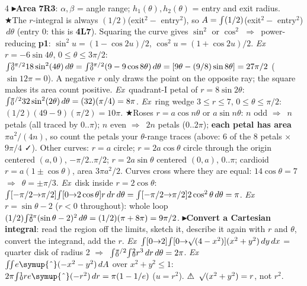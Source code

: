 \documentclass{article}
\newcommand\subx[1]{\sb{\smash{\raise0.20em\hbox{$\scriptstyle#1$}}}}    %
\newcommand\supy[1]{\sp{\smash{\lower0.02em\hbox{$\scriptstyle#1$}}}}    %
\newcommand\suby[1]{\sb{\smash{\raise0.10em\hbox{$\scriptstyle#1$}}}}    %
\newcommand\cx{\mathord{\symup{\char"5E}}}                               %
\newcommand\I[2]{{\smash{\int}}\suby{#1}\supy{#2}}                        %
\newcommand\Ia[2]{{\smash{\int}}[#1{\to}#2]}                              %
\newcommand\J{{\smash{\int}}}                                             %
\newcommand\II[1]{{\smash{\iint}}\subx{#1}}                               %
\newcommand\sh[1]{{\setlength\fboxsep{0.18pt}\colorbox{black!22}{\textbf{#1}}}}  %
\newcommand\pt[1]{\textbf{{\symf ▸}#1}}       %
\newcommand\ex{\textit{Ex}\ }                  %
\newcommand\warn{{\symf ⚠}}                    %
\newcommand\shc{{\symf ★}}                      %
\newcommand\ok{{\symf ✓}}                       %
\newcommand\rt{\smash{\surd}}                  %
\newcommand\then{\ensuremath{\Rightarrow}}
\begin{document}
\begin{multicols*}{4}
\pt{Area} \sh{7R3}: $\alpha,\beta$ = angle range; $h_1(\theta),h_2(\theta)$ = entry and exit radius. \shc The $r$-integral is always $(1/2)$(exit$^2-$ entry$^2$), so $A=\J(1/2)$(exit$^2-$ entry$^2$)$\,d\theta$ (entry 0: this is \sh{4L7}). Squaring the curve gives $\sin^2$ or $\cos^2$ \then\ power-reducing \sh{p1}: $\sin^2u=(1-\cos2u)/2$, $\cos^2u=(1+\cos2u)/2$. \ex $r=-6\sin4\theta$, $0\le\theta\le3\pi/2$: $\I{0}{3\pi/2}18\sin^2(4\theta)\,d\theta=\I{0}{3\pi/2}(9-9\cos8\theta)\,d\theta=[9\theta-(9/8)\sin8\theta]=27\pi/2$ ($\sin12\pi=0$). A negative $r$ only draws the point on the opposite ray; the square makes its area count positive. \ex quadrant-I petal of $r=8\sin2\theta$: $\I{0}{\pi/2}32\sin^2(2\theta)\,d\theta=(32)(\pi/4)=8\pi$. \ex ring wedge $3\le r\le7$, $0\le\theta\le\pi/2$: $(1/2)(49-9)(\pi/2)=10\pi$. \shc Roses $r=a\cos n\theta$ or $a\sin n\theta$: $n$ odd \then\ $n$ petals (all traced by $0..\pi$); $n$ even \then\ $2n$ petals ($0..2\pi$); \textbf{each petal has area $\pi a^2/(4n)$}, so count the petals your $\theta$-range traces (above: 6 of the 8 petals × $9\pi/4$ \ok). Other curves: $r=a$ circle; $r=2a\cos\theta$ circle through the origin centered $(a,0)$, $-\pi/2..\pi/2$; $r=2a\sin\theta$ centered $(0,a)$, $0..\pi$; cardioid $r=a(1\pm\cos\theta)$, area $3\pi a^2/2$. Curves cross where they are equal: $14\cos\theta=7$ \then\ $\theta=\pm\pi/3$. \ex disk inside $r=2\cos\theta$: $\Ia{-\pi/2}{\pi/2}\Ia{0}{2\cos\theta}r\,dr\,d\theta=\Ia{-\pi/2}{\pi/2}2\cos^2\theta\,d\theta=\pi$. \ex $r=\sin\theta-2$ ($r<0$ throughout): whole loop $(1/2)\I{0}{2\pi}(\sin\theta-2)^2\,d\theta=(1/2)(\pi+8\pi)=9\pi/2$.
\pt{Convert a Cartesian integral}: read the region off the limits, sketch it, describe it again with $r$ and $\theta$, convert the integrand, add the $r$. \ex $\Ia{0}{2}\Ia{0}{\rt(4-x^2)}(x^2+y^2)\,dy\,dx$ = quarter disk of radius 2 \then\ $\I{0}{\pi/2}\I{0}{2}r^3\,dr\,d\theta=2\pi$. \ex $\II{}e\cx(-x^2-y^2)\,dA$ over $x^2+y^2\le1$: $2\pi\I{0}{1}re\cx(-r^2)\,dr=\pi(1-1/e)$ ($u=r^2$). \warn\ $\rt(x^2+y^2)=r$, not $r^2$.


\end{multicols*}
\end{document}
